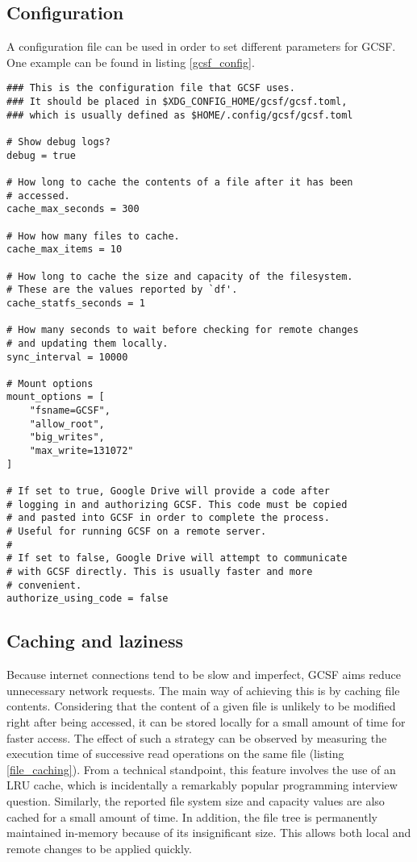 \subsection{Configuration}

A configuration file can be used in order to set different parameters for GCSF. One example can be found in listing \ref{gcsf_config}. 

\begin{lstlisting}[basicstyle=\footnotesize\ttfamily,caption=GCSF configuration file, frame=single, label=gcsf_config,float]
### This is the configuration file that GCSF uses.
### It should be placed in $XDG_CONFIG_HOME/gcsf/gcsf.toml,
### which is usually defined as $HOME/.config/gcsf/gcsf.toml

# Show debug logs?
debug = true

# How long to cache the contents of a file after it has been
# accessed.
cache_max_seconds = 300

# How how many files to cache.
cache_max_items = 10

# How long to cache the size and capacity of the filesystem.
# These are the values reported by `df'.
cache_statfs_seconds = 1

# How many seconds to wait before checking for remote changes
# and updating them locally.
sync_interval = 10000

# Mount options
mount_options = [
    "fsname=GCSF",
    "allow_root",
    "big_writes",
    "max_write=131072"
]

# If set to true, Google Drive will provide a code after
# logging in and authorizing GCSF. This code must be copied
# and pasted into GCSF in order to complete the process.
# Useful for running GCSF on a remote server.
#
# If set to false, Google Drive will attempt to communicate
# with GCSF directly. This is usually faster and more
# convenient.
authorize_using_code = false
\end{lstlisting}


\subsection{Caching and laziness}

Because internet connections tend to be slow and imperfect, GCSF aims reduce unnecessary network requests. The main way of achieving this is by caching file contents. Considering that the content of a given file is unlikely to be modified right after being accessed, it can be stored locally for a small amount of time for faster access. The effect of such a strategy can be observed by measuring the execution time of successive read operations on the same file (listing \ref{file_caching}). From a technical standpoint, this feature involves the use of an LRU cache, which is incidentally a remarkably popular programming interview question. Similarly, the reported file system size and capacity values are also cached for a small amount of time. In addition, the file tree is permanently maintained in-memory because of its insignificant size. This allows both local and remote changes to be applied quickly.

